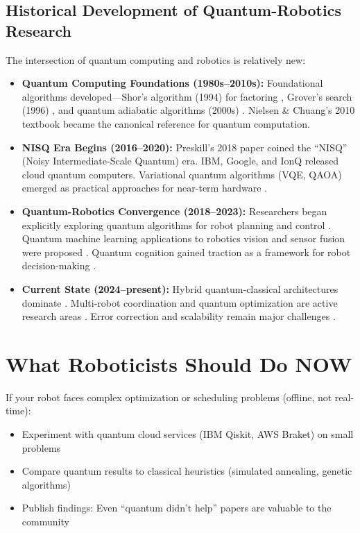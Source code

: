 \documentclass[journal]{IEEEtran}
\begin{document}
\subsection{Historical Development of Quantum-Robotics Research}

The intersection of quantum computing and robotics is relatively new:

\begin{itemize}
\item \textbf{Quantum Computing Foundations (1980s--2010s):} Foundational algorithms developed---Shor's algorithm (1994) for factoring \cite{b28}, Grover's search (1996) \cite{b28}, and quantum adiabatic algorithms (2000s) \cite{b15}. Nielsen \& Chuang's 2010 textbook \cite{b4} became the canonical reference for quantum computation.

\item \textbf{NISQ Era Begins (2016--2020):} Preskill's 2018 paper \cite{b9} coined the ``NISQ'' (Noisy Intermediate-Scale Quantum) era. IBM, Google, and IonQ released cloud quantum computers. Variational quantum algorithms (VQE, QAOA) emerged as practical approaches for near-term hardware \cite{b15, b20, b21}.

\item \textbf{Quantum-Robotics Convergence (2018--2023):} Researchers began explicitly exploring quantum algorithms for robot planning and control \cite{b6, b7, b8}. Quantum machine learning applications to robotics vision and sensor fusion were proposed \cite{b19, b23}. Quantum cognition gained traction as a framework for robot decision-making \cite{b49, b50, b62}.

\item \textbf{Current State (2024--present):} Hybrid quantum-classical architectures dominate \cite{b20, b21}. Multi-robot coordination and quantum optimization are active research areas \cite{b6, b7}. Error correction and scalability remain major challenges \cite{b13, b14}.
\end{itemize}

\section{What Roboticists Should Do NOW}

If your robot faces complex optimization or scheduling problems (offline, not real-time):

\begin{itemize}
\item Experiment with quantum cloud services (IBM Qiskit, AWS Braket) on small problems
\item Compare quantum results to classical heuristics (simulated annealing, genetic algorithms) \cite{b60, b59}
\item Publish findings: Even ``quantum didn't help'' papers are valuable to the community
\end{itemize}
\end{document}
